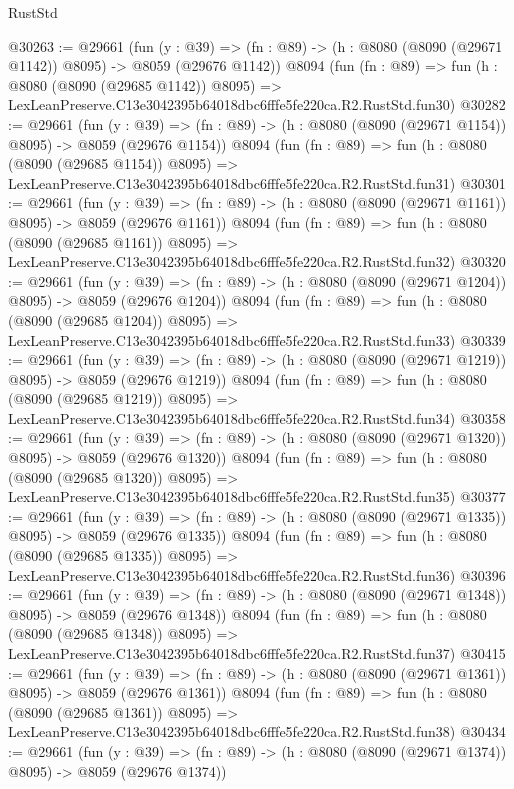 \begin{lexlean}{RustStd}
\begin{coremodule}
@30263 := @29661
    (fun (y : @39) =>
    (fn : @89) -> (h : @8080 (@8090 (@29671 @1142)) @8095) -> @8059 (@29676 @1142))
    @8094
    (fun (fn : @89) =>
    fun (h : @8080 (@8090 (@29685 @1142)) @8095) =>
    LexLeanPreserve.C13e3042395b64018dbc6fffe5fe220ca.R2.RustStd.fun30)
@30282 := @29661
    (fun (y : @39) =>
    (fn : @89) -> (h : @8080 (@8090 (@29671 @1154)) @8095) -> @8059 (@29676 @1154))
    @8094
    (fun (fn : @89) =>
    fun (h : @8080 (@8090 (@29685 @1154)) @8095) =>
    LexLeanPreserve.C13e3042395b64018dbc6fffe5fe220ca.R2.RustStd.fun31)
@30301 := @29661
    (fun (y : @39) =>
    (fn : @89) -> (h : @8080 (@8090 (@29671 @1161)) @8095) -> @8059 (@29676 @1161))
    @8094
    (fun (fn : @89) =>
    fun (h : @8080 (@8090 (@29685 @1161)) @8095) =>
    LexLeanPreserve.C13e3042395b64018dbc6fffe5fe220ca.R2.RustStd.fun32)
@30320 := @29661
    (fun (y : @39) =>
    (fn : @89) -> (h : @8080 (@8090 (@29671 @1204)) @8095) -> @8059 (@29676 @1204))
    @8094
    (fun (fn : @89) =>
    fun (h : @8080 (@8090 (@29685 @1204)) @8095) =>
    LexLeanPreserve.C13e3042395b64018dbc6fffe5fe220ca.R2.RustStd.fun33)
@30339 := @29661
    (fun (y : @39) =>
    (fn : @89) -> (h : @8080 (@8090 (@29671 @1219)) @8095) -> @8059 (@29676 @1219))
    @8094
    (fun (fn : @89) =>
    fun (h : @8080 (@8090 (@29685 @1219)) @8095) =>
    LexLeanPreserve.C13e3042395b64018dbc6fffe5fe220ca.R2.RustStd.fun34)
@30358 := @29661
    (fun (y : @39) =>
    (fn : @89) -> (h : @8080 (@8090 (@29671 @1320)) @8095) -> @8059 (@29676 @1320))
    @8094
    (fun (fn : @89) =>
    fun (h : @8080 (@8090 (@29685 @1320)) @8095) =>
    LexLeanPreserve.C13e3042395b64018dbc6fffe5fe220ca.R2.RustStd.fun35)
@30377 := @29661
    (fun (y : @39) =>
    (fn : @89) -> (h : @8080 (@8090 (@29671 @1335)) @8095) -> @8059 (@29676 @1335))
    @8094
    (fun (fn : @89) =>
    fun (h : @8080 (@8090 (@29685 @1335)) @8095) =>
    LexLeanPreserve.C13e3042395b64018dbc6fffe5fe220ca.R2.RustStd.fun36)
@30396 := @29661
    (fun (y : @39) =>
    (fn : @89) -> (h : @8080 (@8090 (@29671 @1348)) @8095) -> @8059 (@29676 @1348))
    @8094
    (fun (fn : @89) =>
    fun (h : @8080 (@8090 (@29685 @1348)) @8095) =>
    LexLeanPreserve.C13e3042395b64018dbc6fffe5fe220ca.R2.RustStd.fun37)
@30415 := @29661
    (fun (y : @39) =>
    (fn : @89) -> (h : @8080 (@8090 (@29671 @1361)) @8095) -> @8059 (@29676 @1361))
    @8094
    (fun (fn : @89) =>
    fun (h : @8080 (@8090 (@29685 @1361)) @8095) =>
    LexLeanPreserve.C13e3042395b64018dbc6fffe5fe220ca.R2.RustStd.fun38)
@30434 := @29661
    (fun (y : @39) =>
    (fn : @89) -> (h : @8080 (@8090 (@29671 @1374)) @8095) -> @8059 (@29676 @1374))

\end{coremodule}
\end{lexlean}
